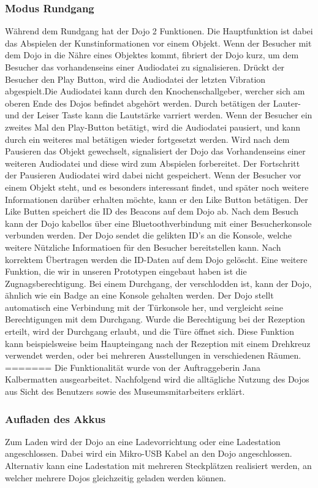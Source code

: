 \subsubsection{Modus Rundgang}
Während dem Rundgang hat der Dojo 2 Funktionen. Die Hauptfunktion ist dabei das Abspielen der Kunstinformationen vor einem Objekt. Wenn der Besucher mit dem Dojo in die Nähre eines Objektes kommt, fibriert der Dojo kurz, um dem Besucher das vorhandenseins einer Audiodatei zu signalisieren. Drückt der Besucher den Play Button, wird die Audiodatei der letzten Vibration abgespielt.Die Audiodatei kann durch den Knochenschallgeber, wercher sich am oberen Ende des Dojos befindet abgehört werden. Durch betätigen der Lauter-und der Leiser Taste kann die Lautstärke varriert werden. Wenn der Besucher ein zweites Mal den Play-Button betätigt, wird die Audiodatei pausiert, und kann durch ein weiteres mal betätigen wieder fortgesetzt werden. Wird nach dem Pausieren das Objekt gewechselt, signalisiert der Dojo das Vorhandenseins einer weiteren Audiodatei und diese wird zum Abspielen forbereitet. Der Fortschritt der Pausieren Audiodatei wird dabei nicht gespeichert. Wenn der Besucher vor einem Objekt steht, und es besonders interessant findet, und später noch weitere Informationen darüber erhalten möchte, kann er den Like Button betätigen. Der Like Butten speichert die ID des Beacons auf dem Dojo ab. Nach dem Besuch kann der Dojo kabellos über eine Bluetoothverbindung mit einer Besucherkonsole verbunden werden. Der Dojo sendet die gelikten ID's an die Konsole, welche weitere Nützliche Informatioen für den Besucher bereitstellen kann. Nach korrektem Übertragen werden die ID-Daten auf dem Dojo gelöscht.
Eine weitere Funktion, die wir in unseren Prototypen eingebaut haben ist die Zugnagsberechtigung. Bei einem Durchgang, der verschlodden ist, kann der Dojo, ähnlich wie ein Badge an eine Konsole gehalten werden. Der Dojo stellt automatisch eine Verbindung mit der Türkonsole her, und vergleicht seine Berechtigungen mit dem Durchgang. Wurde die Berechtigung bei der Rezeption erteilt, wird der Durchgang erlaubt, und die Türe öffnet sich. Diese Funktion kann beispielsweise beim Haupteingang nach der Rezeption mit einem Drehkreuz verwendet werden, oder bei mehreren Ausstellungen in verschiedenen Räumen.
=======
Die Funktionalität wurde von der Auftraggeberin Jana Kalbermatten ausgearbeitet. Nachfolgend wird die alltägliche Nutzung des Dojos aus Sicht des Benutzers sowie des Museumsmitarbeiters erklärt.
\subsubsection{Aufladen des Akkus}
Zum Laden wird der Dojo an eine Ladevorrichtung oder eine Ladestation angeschlossen. Dabei wird ein Mikro-USB Kabel an den Dojo angeschlossen. Alternativ kann eine Ladestation mit mehreren Steckplätzen realisiert werden, an welcher mehrere Dojos gleichzeitig geladen werden können.
